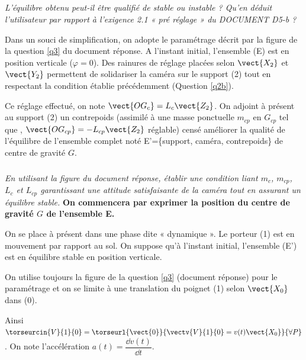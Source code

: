 \documentclass[10pt,fleqn]{article} %
\begin{document}
\subparagraph{\label{q2c}}\textit{L’équilibre obtenu peut-il être qualifié de stable ou instable ? Qu’en déduit l’utilisateur par rapport à l’exigence 2.1  « pré réglage » du DOCUMENT D5-b ?}


Dans un souci de simplification, on adopte le paramétrage décrit par la figure de la question \ref{q3} du document réponse. A l'instant initial, l'ensemble (E) est en position verticale ($\varphi = 0$).
Des rainures de réglage placées selon $\vect{X_2}$ et $\vect{Y_2}$ permettent de solidariser la caméra sur le support (2) tout en respectant la condition établie précédemment (Question \ref{q2b}). 

Ce réglage effectué, on note $\vect{OG_c}=L_c\vect{Z_2}$. On adjoint à présent au support (2) un contrepoids 
(assimilé à une masse ponctuelle $m_{cp}$ en $G_{cp}$ tel que , $\vect{OG_{cp}}=-L_{cp}\vect{Z_2}$ réglable) 
censé améliorer la qualité de l’équilibre de l'ensemble complet noté E'=\{support, caméra, contrepoids\} de centre 
de gravité $G$.


\subparagraph{\label{q3}}\textit{En utilisant la figure du document réponse, établir une condition liant $m_c$, $m_{cp}$, $L_c$ et $L_{cp}$  garantissant une attitude satisfaisante de la caméra tout en assurant un équilibre stable.}
\textbf{On commencera par exprimer la position du centre de gravité $G$ de l'ensemble E.}

On se place à présent dans une phase dite « dynamique ». Le porteur (1) est en mouvement par rapport au sol. On suppose qu'à l'instant initial, l'ensemble (E') est en équilibre stable en position verticale.

On utilise toujours la figure de la question \ref{q3} (document réponse) pour le paramétrage et on se limite à une translation du poignet (1) selon $\vect{X_0}$ dans (0). 

Ainsi $\torseurcin{V}{1}{0}=\torseurl{\vect{0}}{\vectv{V}{1}{0}=v(t)\vect{X_0}}{\forall P}$.
On note l’accélération  $a(t)=\dfrac{\dd v(t)}{\dd t}$.
\end{document}
